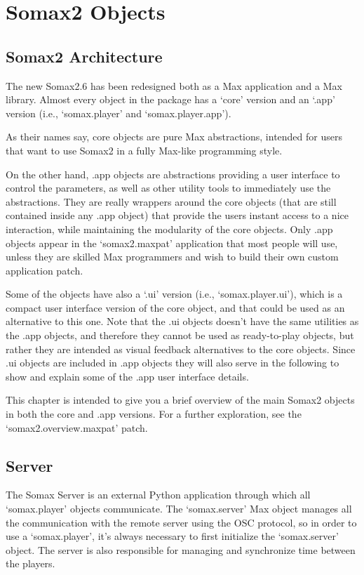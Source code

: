 \chapter{Somax2 Objects}\label{sec:objects}

\section{Somax2 Architecture}
The new Somax2.6 has been redesigned both as a Max application and a Max library. Almost every object in the package has a `core' version and an `.app' version (i.e., `somax.player' and `somax.player.app'). 

As their names say, core objects are pure Max abstractions, intended for users that want to use Somax2 in a fully Max-like programming style. 

On the other hand, .app objects are abstractions providing a user interface to control the parameters, as well as other utility tools to immediately use the abstractions. They are really wrappers around the core objects (that are still contained inside any .app object) that provide the users instant access to a nice interaction, while maintaining the modularity of the core objects. 
Only .app objects appear in the `somax2.maxpat' application that most people will use, unless they are skilled Max programmers and wish to build their own custom application patch.

Some of the objects have also a `.ui' version (i.e., `somax.player.ui'), which is a compact user interface version of the core object, and that could be used as an alternative to this one. Note that the .ui objects doesn't have the same utilities as the .app objects, and therefore they cannot be used as ready-to-play objects, but rather they are intended as visual feedback alternatives to the core objects. Since .ui objects are included in .app objects they will also serve in the following to show and explain some of the .app user interface details.

This chapter is intended to give you a brief overview of the main Somax2 objects in both the core and .app versions. For a further exploration, see the `somax2.overview.maxpat' patch.



\section{Server}

The Somax Server is an external Python application through which all `somax.player' objects communicate. The `somax.server' Max object manages all the communication with the remote server using the OSC protocol, so in order to use a `somax.player', it's always necessary to first initialize the `somax.server' object. The server is also responsible for managing and synchronize time between the players. 

